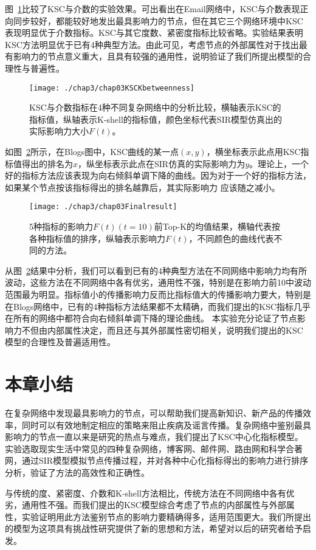 图~\ref{fig:chap03KSCKbetweenness}比较了KSC与介数的实验效果。可出看出在Email网络中，KSC与介数表现正向同步较好，都能较好地发出最具影响力的节点，但在其它三个网络环境中KSC表现明显优于介数指标。KSC与其它度数、紧密度指标比较省略。实验结果表明KSC方法明显优于已有4种典型方法。由此可见，考虑节点的外部属性对于找出最有影响力的节点意义重大，且具有较强的通用性，说明验证了我们所提出模型的合理性与普遍性。
\begin{figure}[H] 
	\centering
	\texttt{[image: ./chap3/chap03KSCKbetweenness]}
	\caption{KSC与介数指标在4种不同复杂网络中的分析比较，横轴表示KSC的指标值，纵轴表示K-shell的指标值，颜色坐标代表SIR模型仿真出的实际影响力大小$F(t)$。}
	\label{fig:chap03KSCKbetweenness}
\end{figure}
如图~\ref{fig:chap03Finalresult}所示，在Blogs图中，KSC曲线的某一点$(x,y)$，横坐标表示此点用KSC指标值得出的排名为$x$，纵坐标表示此点在SIR仿真的实际影响力为$y$。理论上，一个好的指标方法应该表现为向右倾斜单调下降的曲线。因为对于一个好的指标方法，如果某个节点按该指标得出的排名越靠后，其实际影响力 应该随之减小。
\begin{figure}[H] 
	\centering
	\texttt{[image: ./chap3/chap03Finalresult]}
	\caption{5种指标的影响力$F(t)(t=10)$前Top-K的均值结果，横轴代表按各种指标值的排序，纵轴表示影响力$F(t)$，不同颜色的曲线代表不同的方法。}
	\label{fig:chap03Finalresult}
\end{figure}
从图~\ref{fig:chap03Finalresult}结果中分析，我们可以看到已有的4种典型方法在不同网络中影响力均有所波动，这些方法在不同网络中各有优劣，通用性不强，特别是在影响力前10中波动范围最为明显。指标值小的传播影响力反而比指标值大的传播影响力要大，特别是在Blogs网络中，已有的4种指标方法结果都不太精确，而我们提出的KSC指标几乎在所有的网络中都符合向右倾斜单调下降的理论曲线。
本实验充分论证了节点影响力不但由内部属性决定，而且还与其外部属性密切相关，说明我们提出的KSC模型的合理性及普遍适用性。

\section{本章小结}
在复杂网络中发现最具影响力的节点，可以帮助我们提高新知识、新产品的传播效率，同时可以有效地制定相应的策略来阻止疾病及谣言传播。复杂网络中鉴别最具影响力的节点一直以来是研究的热点与难点，我们提出了KSC中心化指标模型。实验选取现实生活中常见的四种复杂网络，博客网、邮件网、路由网和科学合著网，通过SIR模型模拟节点传播过程，并对各种中心化指标得出的影响力进行排序分析，验证了方法的高效性和正确性。

与传统的度、紧密度、介数和K-shell方法相比，传统方法在不同网络中各有优劣，通用性不强。而我们提出的KSC模型综合考虑了节点的内部属性与外部属性，实验证明用此方法鉴别节点的影响力要精确得多，适用范围更大。我们所提出的模型为这项具有挑战性研究提供了新的思想和方法，希望对以后的研究者给予启发。


